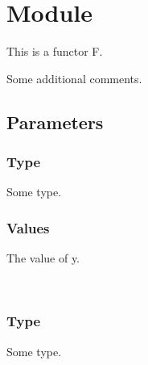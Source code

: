 \section{Module }\label{Nested-F}%
This is a functor F.

Some additional comments.

\subsection{Parameters\label{Nested-F--parameters}}%
\label{Nested-F--argument-1-Arg1}\label{Nested-F-argument-1-Arg1}\begin{ocamlindent}\subsubsection{Type\label{Nested-F-argument-1-Arg1--type}}%
\label{Nested-F-argument-1-Arg1--type-t}\begin{ocamlindent}Some type.\end{ocamlindent}%
\medbreak
\subsubsection{Values\label{Nested-F-argument-1-Arg1--values}}%
\label{Nested-F-argument-1-Arg1--val-y}\begin{ocamlindent}The value of y.\end{ocamlindent}%
\medbreak
\end{ocamlindent}%
\\
\label{Nested-F--argument-2-Arg2}\label{Nested-F-argument-2-Arg2}\begin{ocamlindent}\subsubsection{Type\label{Nested-F-argument-2-Arg2--type_2}}%
\label{Nested-F-argument-2-Arg2--type-t}\begin{ocamlindent}Some type.\end{ocamlindent}%
\medbreak
\end{ocamlindent}%
\\
